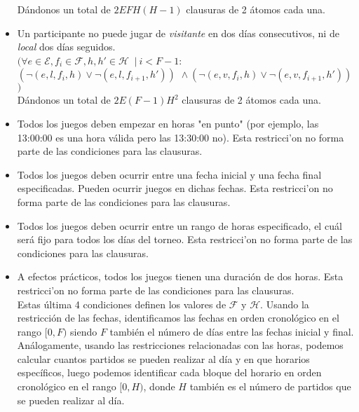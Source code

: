 \documentclass[a4paper,10pt]{article}
\newcommand{\tab}{\hspace*{0.5cm}}
\begin{document}
\begin{itemize}
      D\'andonos un total de $2EFH(H-1)$ clausuras de 2 \'atomos cada una.\\

      \item Un participante no puede jugar de \textit{visitante} en dos días 
      consecutivos, ni de \textit{local} dos días seguidos.\\

      $(\forall e \in \mathcal{E}, f_i \in \mathcal{F}, h, h' \in \mathcal{H} \: $
      $| \: i < F-1 : $ \\
      \tab $(\neg (e, l, f_i, h) \vee \neg (e, l, f_{i+1}, h')) \: $
      $\wedge \: (\neg (e, v, f_i, h) \vee \neg (e, v, f_{i+1}, h'))$\\
      $)$\\

      D\'andonos un total de $2E(F-1)H^2$ clausuras de 2 \'atomos cada una.

      \item Todos los juegos deben empezar en horas "en punto" (por ejemplo, 
      las 13:00:00 es una hora válida pero las 13:30:00 no). Esta restricci'on
      no forma parte de las condiciones para las clausuras.

      \item Todos los juegos deben ocurrir entre una fecha inicial y una fecha final 
      especificadas. Pueden ocurrir juegos en dichas fechas. Esta restricci'on
      no forma parte de las condiciones para las clausuras.

      \item Todos los juegos deben ocurrir entre un rango de horas especificado, el 
      cuál será fijo para todos los días del torneo. Esta restricci'on no forma 
      parte de las condiciones para las clausuras.

      \item A efectos prácticos, todos los juegos tienen una duración de dos horas.
      Esta restricci'on no forma parte de las condiciones para las clausuras.\\
      
      Estas \'ultima 4 condiciones definen los valores de $\mathcal{F}$ y 
      $\mathcal{H}$. Usando la restricci\'on de las fechas, identificamos las 
      fechas en orden cronol\'ogico en el rango $[0,F)$ siendo $F$ tambi\'en el 
      n\'umero de d\'ias entre las fechas inicial y final. An\'alogamente, usando 
      las restricciones relacionadas con las horas, podemos calcular cuantos 
      partidos se pueden realizar al d\'ia y en que horarios espec\'ificos, luego 
      podemos identificar cada bloque del horario en orden cronol\'ogico en el 
      rango $[0, H)$, donde $H$ tambi\'en es el n\'umero de partidos que se pueden 
      realizar al d\'ia.
    \end{itemize}
\end{document}
